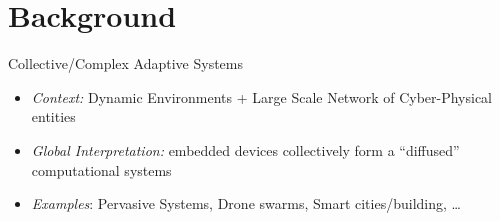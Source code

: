 \documentclass[8pt, aspectratio=169, handout]{beamer}
\begin{document}
\section{Background}
\begin{frame}{Collective/Complex Adaptive Systems}
  \begin{card}
    \begin{itemize}
      \item [\faArrowRight] \emph{Context:} Dynamic Environments + Large Scale Network of Cyber-Physical entities
      \item [\faArrowRight] \emph{Global Interpretation:} embedded devices collectively form a ``diffused'' computational systems
      \item [\faArrowRight] \emph{Examples}: Pervasive Systems, Drone swarms, Smart cities/building, \dots
    \end{itemize}
  \end{card}
  \centering
  \begin{multicols*}{3}
  \end{multicols*}
\end{frame}
\end{document}
